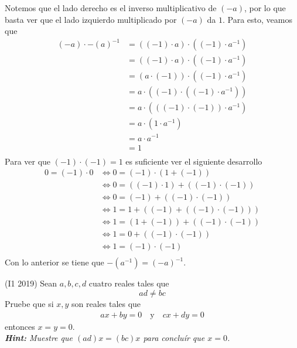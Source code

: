 \documentclass{ayudantia}
\begin{document}
\begin{ans}
    \begin{sol}
        Notemos que el lado derecho es el inverso multiplicativo de \((-a)\), por lo que basta ver que el lado izquierdo multiplicado por \((-a)\) da \(1\). Para esto, veamos que
        \begin{align*}
            (-a)\cdot-(a)^{-1} & = ((-1)\cdot a)\cdot((-1)\cdot a^{-1})\\
            & = ((-1)\cdot a)\cdot((-1)\cdot a^{-1})\\
            & = (a\cdot (-1))\cdot((-1)\cdot a^{-1})\\
            & = a\cdot ((-1)\cdot((-1)\cdot a^{-1}))\\
            & = a\cdot (((-1)\cdot(-1))\cdot a^{-1})\\
            & = a\cdot (1\cdot a^{-1})\\
            & = a\cdot  a^{-1}\\
            & = 1\\
        \end{align*}
        Para ver que \((-1)\cdot(-1)=1\) es suficiente ver el siguiente desarrollo
        \begin{align*}
            0=(-1)\cdot 0&\iff 0=(-1)\cdot(1+(-1))\\
            &\iff 0=((-1)\cdot 1)+((-1)\cdot(-1))\\
            &\iff 0=(-1)+((-1)\cdot(-1))\\
            &\iff 1=1+((-1)+((-1)\cdot(-1)))\\
            &\iff 1=(1+(-1))+((-1)\cdot(-1))\\
            &\iff 1=0+((-1)\cdot(-1))\\
            &\iff 1=(-1)\cdot(-1)\\
        \end{align*}
        Con lo anterior se tiene que \(-(a^{-1})=(-a)^{-1}\).
    \end{sol}
\end{ans}


\begin{prob}
    (I1 2019) Sean \(a,b,c,d\) cuatro reales tales que
    \begin{equation*}
        ad\neq bc
    \end{equation*}
    Pruebe que si \(x,y\) son reales tales que
    \begin{align*}
        ax+by=0\quad\text{y}\quad cx+dy=0
    \end{align*}
    entonces \(x=y=0\).\\
    \textit{\textbf{Hint:} Muestre que \((ad)x=(bc)x\) para concluír que \(x=0\).}
\end{prob}
\end{document}
